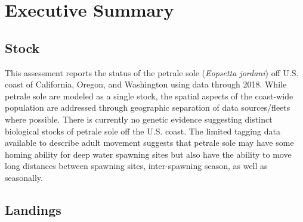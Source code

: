 \documentclass[12pt,]{article}
\begin{document}
{
\setcounter{tocdepth}{4}
\tableofcontents
}
\setlength{\parskip}{5mm plus1mm minus1mm} \pagebreak

\setcounter{page}{1} \renewcommand{\thefigure}{\alph{figure}}
\renewcommand{\thetable}{\alph{table}}

\section*{Executive Summary}\label{executive-summary}

\subsection*{Stock}\label{stock}

This assessment reports the status of the petrale sole
(\emph{Eopsetta jordani}) off U.S. coast of California, Oregon, and
Washington using data through 2018. While petrale sole are modeled as a
single stock, the spatial aspects of the coast-wide population are
addressed through geographic separation of data sources/fleets where
possible. There is currently no genetic evidence suggesting distinct
biological stocks of petrale sole off the U.S. coast. The limited
tagging data available to describe adult movement suggests that petrale
sole may have some homing ability for deep water spawning sites but also
have the ability to move long distances between spawning sites,
inter-spawning season, as well as seasonally.

\subsection*{Landings}\label{landings}
\end{document}
